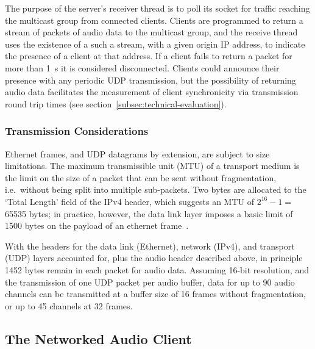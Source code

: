 \documentclass[utf8]{FrontiersinHarvard}
\newcommand{\secref}[1]{section~\ref{#1}}
\begin{document}
    The purpose of the server's receiver thread is to poll its socket for traffic
    reaching the multicast group from connected clients.
    Clients are programmed to return a stream of packets of audio data to the
    multicast group, and the receive thread uses the existence of a such a stream,
    with a given origin IP address, to indicate the presence of a client at that
    address.
    If a client fails to return a packet for more than \qty{1}{\second} it is
    considered disconnected.
    Clients could announce their presence with any periodic UDP transmission, but
    the possibility of returning audio data facilitates the measurement of client
    synchronicity via transmission round trip times (see
    \secref{subsec:technical-evaluation}).

    \subsubsection{Transmission Considerations}\label{subsubsec:transmission-considerations}

    Ethernet frames, and UDP datagrams by extension, are subject to size
    limitations.
    The maximum transmissible unit (MTU) of a transport medium is the limit on the
    size of a packet that can be sent without fragmentation, i.e.\ without being
    split into multiple sub-packets.
    Two bytes are allocated to the `Total Length' field of the IPv4 header, which
    suggests an MTU of $2^{16}-1=~$\num{65535} bytes;
    in practice, however, the data link layer imposes a basic limit of \num{1500}
    bytes on the payload of an ethernet
    frame~\citep{schiavoni_alternatives_2013,ieee_ieee_2018}.

    With the headers for the data link (Ethernet), network (IPv4), and transport
    (UDP) layers accounted for, plus the audio header described above, in principle
    \num{1452} bytes remain in each packet for audio data.
    Assuming 16-bit resolution, and the transmission of one UDP packet per audio
    buffer, data for up to 90 audio channels can be transmitted at a buffer size of
    16 frames without fragmentation, or up to 45 channels at 32 frames.

    \subsection{The Networked Audio Client}\label{subsec:networked-audio-client}
\end{document}
